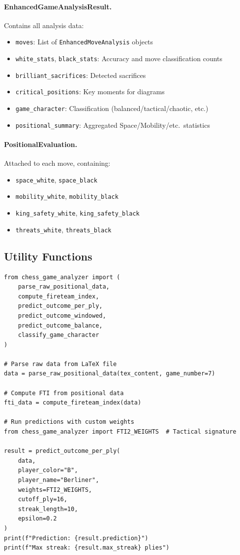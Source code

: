 \documentclass[12pt]{book}
\begin{document}
\paragraph{EnhancedGameAnalysisResult.}
Contains all analysis data:
\begin{itemize}
    \item \texttt{moves}: List of \texttt{EnhancedMoveAnalysis} objects
    \item \texttt{white\_stats}, \texttt{black\_stats}: Accuracy and move classification counts
    \item \texttt{brilliant\_sacrifices}: Detected sacrifices
    \item \texttt{critical\_positions}: Key moments for diagrams
    \item \texttt{game\_character}: Classification (balanced/tactical/chaotic, etc.)
    \item \texttt{positional\_summary}: Aggregated Space/Mobility/etc.\ statistics
\end{itemize}

\paragraph{PositionalEvaluation.}
Attached to each move, containing:
\begin{itemize}
    \item \texttt{space\_white}, \texttt{space\_black}
    \item \texttt{mobility\_white}, \texttt{mobility\_black}
    \item \texttt{king\_safety\_white}, \texttt{king\_safety\_black}
    \item \texttt{threats\_white}, \texttt{threats\_black}
\end{itemize}

\subsection{Utility Functions}

\begin{verbatim}
from chess_game_analyzer import (
    parse_raw_positional_data,
    compute_fireteam_index,
    predict_outcome_per_ply,
    predict_outcome_windowed,
    predict_outcome_balance,
    classify_game_character
)

# Parse raw data from LaTeX file
data = parse_raw_positional_data(tex_content, game_number=7)

# Compute FTI from positional data
fti_data = compute_fireteam_index(data)

# Run predictions with custom weights
from chess_game_analyzer import FTI2_WEIGHTS  # Tactical signature

result = predict_outcome_per_ply(
    data,
    player_color="B",
    player_name="Berliner",
    weights=FTI2_WEIGHTS,
    cutoff_ply=16,
    streak_length=10,
    epsilon=0.2
)
print(f"Prediction: {result.prediction}")
print(f"Max streak: {result.max_streak} plies")
\end{verbatim}
\end{document}
